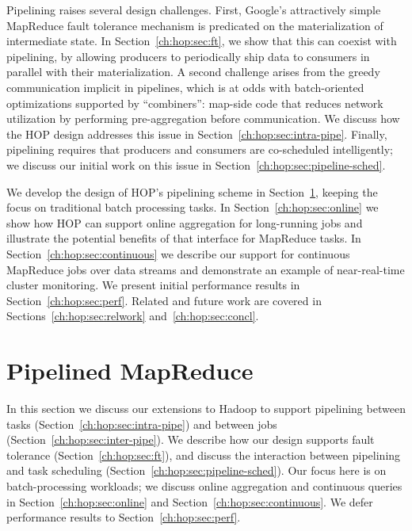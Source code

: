Pipelining raises several design challenges. First, Google's attractively simple
MapReduce fault tolerance mechanism is predicated on the materialization of
intermediate state. In Section~\ref{ch:hop:sec:ft}, we show that this can coexist with
pipelining, by allowing producers to periodically ship data to consumers in
parallel with their materialization.  A second challenge arises from the greedy
communication implicit in pipelines, which is at odds with batch-oriented
optimizations supported by ``combiners'': map-side code that reduces network
utilization by performing pre-aggregation before
communication. We discuss how the HOP design addresses this issue in
Section~\ref{ch:hop:sec:intra-pipe}.  Finally, pipelining requires that producers and
consumers are co-scheduled intelligently; we discuss our initial work on this
issue in Section~\ref{ch:hop:sec:pipeline-sched}.

We develop the design of HOP's pipelining scheme in Section~\ref{ch:hop:sec:pipelining}, keeping the
focus on traditional batch processing tasks.  In Section~\ref{ch:hop:sec:online} we
show how HOP can support online aggregation for long-running jobs and illustrate
the potential benefits of that interface for MapReduce tasks.  In
Section~\ref{ch:hop:sec:continuous} we describe our support for continuous MapReduce
jobs over data streams and demonstrate an example of near-real-time cluster
monitoring.  We present initial performance results in
Section~\ref{ch:hop:sec:perf}. Related and future work are covered in
Sections~\ref{ch:hop:sec:relwork} and~\ref{ch:hop:sec:concl}.

\section{Pipelined MapReduce}
\label{ch:hop:sec:pipelining}

In this section we discuss our extensions to Hadoop to support pipelining
between tasks (Section~\ref{ch:hop:sec:intra-pipe}) and between jobs
(Section~\ref{ch:hop:sec:inter-pipe}).  We describe how our design supports fault
tolerance (Section~\ref{ch:hop:sec:ft}), and discuss the interaction between pipelining
and task scheduling (Section~\ref{ch:hop:sec:pipeline-sched}).  Our focus here is on
batch-processing workloads; we discuss online aggregation and continuous queries
in Section~\ref{ch:hop:sec:online} and Section~\ref{ch:hop:sec:continuous}. We defer
performance results to Section~\ref{ch:hop:sec:perf}.

